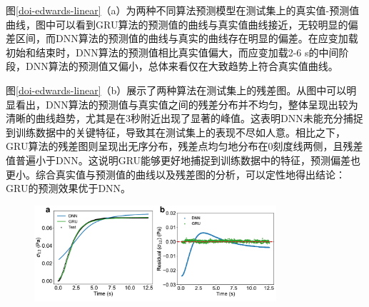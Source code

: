 图\ref{doi-edwards-linear}（a）为两种不同算法预测模型在测试集上的真实值-预测值曲线，图中可以看到GRU算法的预测值的曲线与真实值曲线接近，无较明显的偏差区间，而DNN算法的预测值的曲线与真实的曲线存在明显的偏差。在应变加载初始和结束时，DNN算法的预测值相比真实值偏大，而应变加载2-6 s的中间阶段，DNN算法的预测值又偏小，总体来看仅在大致趋势上符合真实值曲线。

图\ref{doi-edwards-linear}（b）展示了两种算法在测试集上的残差图。从图中可以明显看出，DNN算法的预测值与真实值之间的残差分布并不均匀，整体呈现出较为清晰的曲线趋势，尤其是在3秒附近出现了显著的峰值。这表明DNN未能充分捕捉到训练数据中的关键特征，导致其在测试集上的表现不尽如人意。相比之下，GRU算法的残差图则呈现出无序分布，残差点均匀地分布在0刻度线两侧，且残差值普遍小于DNN。这说明GRU能够更好地捕捉到训练数据中的特征，预测偏差也更小。综合真实值与预测值的曲线以及残差图的分析，可以定性地得出结论：GRU的预测效果优于DNN。
\begin{figure}[htbp]
  \centering
  \includegraphics[width=0.8\textwidth]{Fig/doi-edwards-linear.pdf}
  \FigureBicaption{\label{doi-edwards-linear}}{}
\end{figure}

